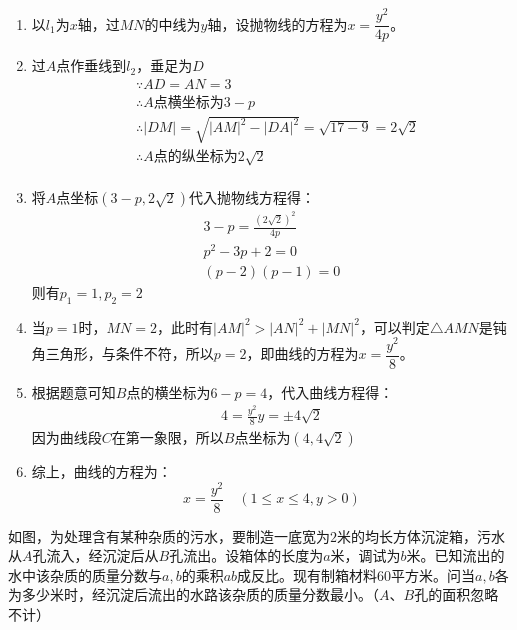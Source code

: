 \documentclass[answers]{exam}
\begin{document}
\begin{questions}
	\begin{solution}
		\begin{enumerate}[label=\protect\circled{\arabic*}]
			\item 以$l_1$为$x$轴，过$MN$的中线为$y$轴，设抛物线的方程为$x=\dfrac{y^2}{4p}$。
			\item 过$A$点作垂线到$l_2$，垂足为$D$
			      \begin{align*}
				       & \because AD = AN = 3                                                  \\
				       & \therefore A \text{点横坐标为} 3-p                                         \\
				       & \therefore  |DM| = \sqrt{|AM|^2 - |DA|^2} = \sqrt{17 - 9} = 2\sqrt{2} \\
				       & \therefore A\text{点的纵坐标为}2\sqrt{2}                                    \\
			      \end{align*}
			\item 将$A$点坐标$(3-p, 2\sqrt{2})$代入抛物线方程得：
			      \begin{align*}
				      3-p = \frac{(2\sqrt{2})^2}{4p} \\
				      p^2 -3p + 2 = 0                \\
				      (p-2)(p-1) = 0
			      \end{align*}
			      则有$p_1 = 1, p_2 = 2$
			\item 当$p=1$时，$MN=2$，此时有$|AM|^2 > |AN|^2 +
				      |MN|^2$，可以判定$\triangle{AMN}$是钝角三角形，与条件不符，所以$p=2$，即曲线的方程为$x=\dfrac{y^2}{8}$。
			\item 根据题意可知$B$点的横坐标为$6-p=4$，代入曲线方程得：
			      \begin{align*}
				      4 = \frac{y^2}{8}
				      y = \pm4\sqrt{2}
			      \end{align*}
			      因为曲线段$C$在第一象限，所以$B$点坐标为$(4,4\sqrt{2})$

			\item 综上，曲线的方程为：
			      \begin{equation*}
				      x = \frac{y^2}{8} \quad (1 \leqslant x \leqslant 4, y>0)
			      \end{equation*}
		\end{enumerate}

	\end{solution}

	\question
	如图，为处理含有某种杂质的污水，要制造一底宽为$2$米的均长方体沉淀箱，污水从$A$孔流入，经沉淀后从$B$孔流出。设箱体的长度为$a$米，调试为$b$米。已知流出的水中该杂质的质量分数与$a,b$的乘积$ab$成反比。现有制箱材料$60$平方米。问当$a,b$各为多少米时，经沉淀后流出的水路该杂质的质量分数最小。（$A$、$B$孔的面积忽略不计）


\end{questions}
\end{document}
